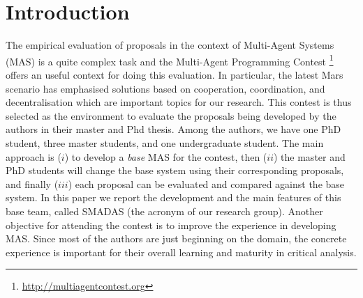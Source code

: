 
\section{Introduction}


The empirical evaluation of proposals in the context of Multi-Agent Systems (MAS) is a quite complex task and the Multi-Agent Programming Contest \cite{behrens:2010,behrens:2011b}\footnote{\url{http://multiagentcontest.org}} offers an useful context for doing this evaluation. In particular, the latest Mars scenario has emphasised solutions based on cooperation, coordination, and decentralisation which are important topics for our research. This contest is thus selected as the environment to evaluate the proposals being developed by the authors in their master and Phd thesis. Among the authors, we have one PhD student, three master students, and one undergraduate student. The main approach is ($i$) to develop a \emph{base} MAS for the contest, then ($ii$) the master and PhD students will change the base system using their corresponding proposals, and finally ($iii$) each proposal can be evaluated and compared against the base system. In this paper we report the development and the main features of this base team, called SMADAS (the acronym of our research group). Another objective for attending the contest is to improve the experience in developing MAS. Since most of the authors are just beginning on the domain, the concrete experience is important for their overall learning and maturity in critical analysis. 


